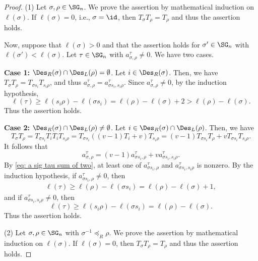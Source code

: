 \documentclass[12pt, reqno]{amsart}
\theoremstyle{plain}
\theoremstyle{definition}
\numberwithin{equation}{section}
\numberwithin{figure}{section}
\numberwithin{table}{section}
\begin{document}
\begin{proof}
(1) Let $\sigma, \rho \in \SG_n$.
We prove the assertion by mathematical induction on $\ell(\sigma)$.
If $\ell(\sigma) = 0$, i.e., $\sigma = \id$, then $T_{\sigma}T_{\rho} = T_{\rho}$ and thus the assertion holds.

Now, suppose that $\ell(\sigma) > 0$ and that the assertion holds for $\sigma' \in \SG_n$ with $\ell(\sigma') < \ell(\sigma)$.
Let $\tau \in \SG_n$ with $a^{\tau}_{\sigma, \rho} \neq 0$.
We have two cases.
\smallskip



{\bf Case 1:} $\Des_R(\sigma) \cap \Des_L(\rho) = \emptyset$.
Let $i \in \Des_R(\sigma)$.
Then, we have $T_\sigma T_\rho = T_{\sigma s_i} T_{s_i \rho}$, and thus 
$a^\tau_{\sigma, \rho} = a^{\tau}_{\sigma s_i, s_i \rho}$.
Since  $a^{\tau}_{\sigma, \rho} \neq 0$,
by the induction hypothesis,
\begin{equation}\label{eq: case one tau has strict longer legnth cond}
\ell(\tau) \geq \ell(s_i \rho) - \ell(\sigma s_i) = \ell(\rho) - \ell(\sigma) + 2 > \ell(\rho) - \ell(\sigma).
\end{equation}  
Thus the assertion holds.
\smallskip


{\bf Case 2:} $\Des_R(\sigma) \cap \Des_L(\rho) \neq \emptyset$.
Let $i \in \Des_R(\sigma) \cap \Des_L(\rho)$.
Then, we have 
\[
T_\sigma T_\rho = 
T_{\sigma s_i} T_i T_i T_{s_i \rho} = T_{\sigma s_i} ((v-1) T_i + v) T_{s_i \rho} = (v-1)T_{\sigma s_i} T_\rho + v T_{\sigma s_i} T_{s_i \rho}.
\]
It follows that
\begin{equation}\label{eq: a sig tau sum of two}
a^{\tau}_{\sigma, \rho} = (v-1) a^{\tau}_{\sigma s_i, \rho} + v a^{\tau}_{\sigma s_i, s_i \rho}.
\end{equation}
By \cref{eq: a sig tau sum of two}, at least one of $a^{\tau}_{\sigma s_i , \rho}$ and $a^{\tau}_{\sigma s_i , s_i \rho}$ is nonzero.
By the induction hypothesis, if $a^{\tau}_{\sigma s_i, \rho} \neq 0$, then
\begin{align}\label{eq: first coeff is zero}
\ell(\tau) \geq  \ell(\rho) - \ell(\sigma s_i) = \ell(\rho) - \ell(\sigma) + 1,
\end{align}
and if $a^{\tau}_{\sigma s_i, s_i \rho} \neq 0$, then
\[
\ell(\tau) \geq \ell(s_i\rho) - \ell(\sigma s_i) = \ell(\rho)-\ell(\sigma).
\]
Thus the assertion holds.


(2) Let $\sigma, \rho \in \SG_n$ with $\sigma^{-1} \preceq_R \rho$.
We prove the assertion by mathematical induction on $\ell(\sigma)$.
If $\ell(\sigma) = 0$,  then $T_{\sigma}T_{\rho} = T_{\rho}$ and thus the assertion holds.


\end{proof}
\end{document}
